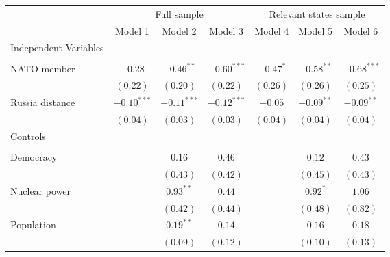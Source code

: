 
\begin{table}[h]
\begin{center}
\begin{tabular}{l c c c c c c}
\hline
 & \multicolumn{3}{c}{Full sample} & \multicolumn{3}{c}{Relevant states sample} \\
\cline{2-4} \cline{5-7}
 & Model 1 & Model 2 & Model 3 & Model 4 & Model 5 & Model 6 \\
\hline
Independent Variables &               &               &               &             &              &               \\
                      &               &               &               &             &              &               \\
\quad NATO member     & $-0.28$       & $-0.46^{**}$  & $-0.60^{***}$ & $-0.47^{*}$ & $-0.58^{**}$ & $-0.68^{***}$ \\
                      & $(0.22)$      & $(0.20)$      & $(0.22)$      & $(0.26)$    & $(0.26)$     & $(0.25)$      \\
\quad Russia distance & $-0.10^{***}$ & $-0.11^{***}$ & $-0.12^{***}$ & $-0.05$     & $-0.09^{**}$ & $-0.09^{**}$  \\
                      & $(0.04)$      & $(0.03)$      & $(0.03)$      & $(0.04)$    & $(0.04)$     & $(0.04)$      \\
Controls              &               &               &               &             &              &               \\
                      &               &               &               &             &              &               \\
\quad Democracy       &               & $0.16$        & $0.46$        &             & $0.12$       & $0.43$        \\
                      &               & $(0.43)$      & $(0.42)$      &             & $(0.45)$     & $(0.43)$      \\
\quad Nuclear power   &               & $0.93^{**}$   & $0.44$        &             & $0.92^{*}$   & $1.06$        \\
                      &               & $(0.42)$      & $(0.44)$      &             & $(0.48)$     & $(0.82)$      \\
\quad Population      &               & $0.19^{**}$   & $0.14$        &             & $0.16$       & $0.18$        \\
                      &               & $(0.09)$      & $(0.12)$      &             & $(0.10)$     & $(0.13)$      \\

\end{tabular}
\end{center}
\end{table}
